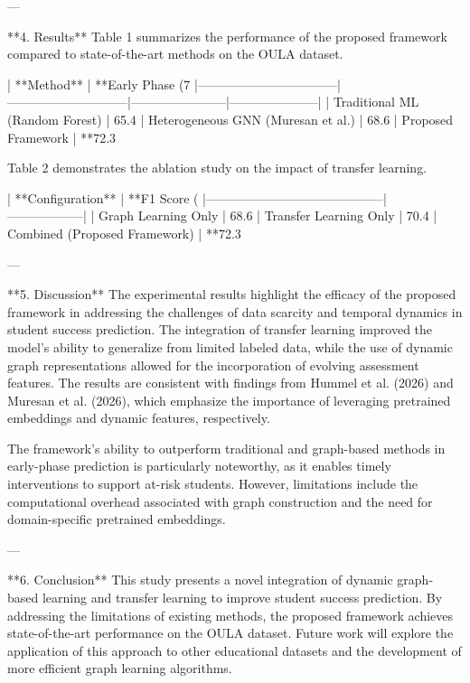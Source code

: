 ---

**4. Results**  
Table 1 summarizes the performance of the proposed framework compared to state-of-the-art methods on the OULA dataset.

| **Method**                     | **Early Phase (7%
|---------------------------------|-----------------------------|-----------------------|---------------------|  
| Traditional ML (Random Forest) | 65.4%
| Heterogeneous GNN (Muresan et al.) | 68.6%
| Proposed Framework             | **72.3%

Table 2 demonstrates the ablation study on the impact of transfer learning.

| **Configuration**                        | **F1 Score (%
|------------------------------------------|------------------|  
| Graph Learning Only                      | 68.6%
| Transfer Learning Only                   | 70.4%
| Combined (Proposed Framework)            | **72.3%

---

**5. Discussion**  
The experimental results highlight the efficacy of the proposed framework in addressing the challenges of data scarcity and temporal dynamics in student success prediction. The integration of transfer learning improved the model's ability to generalize from limited labeled data, while the use of dynamic graph representations allowed for the incorporation of evolving assessment features. The results are consistent with findings from Hummel et al. (2026) and Muresan et al. (2026), which emphasize the importance of leveraging pretrained embeddings and dynamic features, respectively.  

The framework's ability to outperform traditional and graph-based methods in early-phase prediction is particularly noteworthy, as it enables timely interventions to support at-risk students. However, limitations include the computational overhead associated with graph construction and the need for domain-specific pretrained embeddings.

---

**6. Conclusion**  
This study presents a novel integration of dynamic graph-based learning and transfer learning to improve student success prediction. By addressing the limitations of existing methods, the proposed framework achieves state-of-the-art performance on the OULA dataset. Future work will explore the application of this approach to other educational datasets and the development of more efficient graph learning algorithms.  


